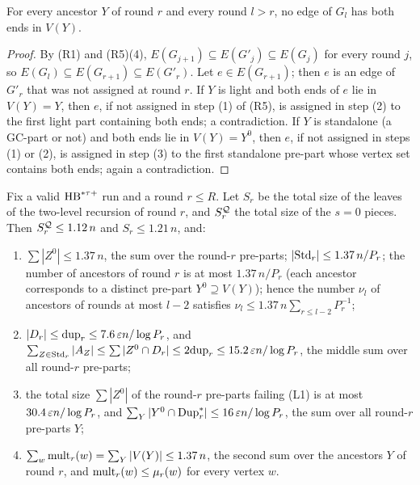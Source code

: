 \begin{lemma}\label{s2:lemEL}
For every ancestor $Y$ of round $r$ and every round $l>r$, no edge of $G_l$ has
both ends in $V(Y)$.
\deps{\ref{s2:defHBtp}, \ref{s2:defAncestors}}
\end{lemma}

\begin{proof}
By (R1) and (R5)(4), $E(G_{j+1})\subseteq E(G'_j)\subseteq E(G_j)$ for every
round $j$, so $E(G_l)\subseteq E(G_{r+1})\subseteq E(G'_r)$. Let $e\in
E(G_{r+1})$; then $e$ is an edge of $G'_r$ that was not assigned at round $r$.
If $Y$ is light and both ends of $e$ lie in $V(Y)=Y$, then $e$, if not assigned
in step (1) of (R5), is assigned in step (2) to the first light part containing
both ends; a contradiction. If $Y$ is standalone (a GC-part or not) and both
ends lie in $V(Y)=Y^0$, then $e$, if not assigned in steps (1) or (2), is
assigned in step (3) to the first standalone pre-part whose vertex set contains
both ends; again a contradiction.
\end{proof}

\begin{proposition}\label{s2:propOV}
Fix a valid $\mathrm{HB}^{*\tau{+}}$ run and a round $r\le R$. Let $S_r$ be the total size of the
leaves of the two-level recursion of round $r$, and $S^{\mathcal{Q}}_r$ the total
size of the $s=0$ pieces. Then $S^{\mathcal{Q}}_r\le1.12\,n$ and $S_r\le1.21\,n$,
and:
\begin{enumerate}
\item[(K1)] $\sum|Z^0|\le1.37\,n$, the sum over the
round-$r$ pre-parts; $|\mathrm{Std}_r|\le1.37\,n/P_r$; the number of ancestors of round
$r$ is at most $1.37\,n/P_r$ (each ancestor corresponds to a distinct pre-part
$Y^0\supseteq V(Y)$); hence the number $\nu_l$ of ancestors of rounds at most
$l-2$ satisfies $\nu_l\le1.37\,n\sum_{r\le l-2}P_r^{-1}$;
\item[(K2)] $|D_r|\le\mathrm{dup}_r\le7.6\,\varepsilon n/\log P_r$,
and $\sum_{Z\in\mathrm{Std}_r}|A_Z|\le\sum|Z^0\cap D_r|\le2\mathrm{dup}_r\le15.2\,\varepsilon n/\log
P_r$, the middle sum over all round-$r$ pre-parts;
\item[(K3)] the total size $\sum|Z^0|$ of the round-$r$
pre-parts failing (L1) is at most $30.4\,\varepsilon n/\log P_r$, and
$\sum_Y|Y^0\cap\mathrm{Dup}^{*}_r|\le16\,\varepsilon n/\log P_r$, the sum over all round-$r$
pre-parts $Y$;
\item[(F11)] $\sum_w\mathrm{mult}_r(w)=\sum_Y|V(Y)|\le1.37\,n$, the second sum over the
ancestors $Y$ of round $r$, and $\mathrm{mult}_r(w)\le\mu_r(w)$ for every vertex $w$.
\end{enumerate}
\deps{\ref{s2:lemOVgeneric}, \ref{s2:lem14tau}, \ref{s2:propStructure}, \ref{s2:defAncestors}, \ref{s2:defHBtp}, \ref{s2:lemSEP}}
\end{proposition}

